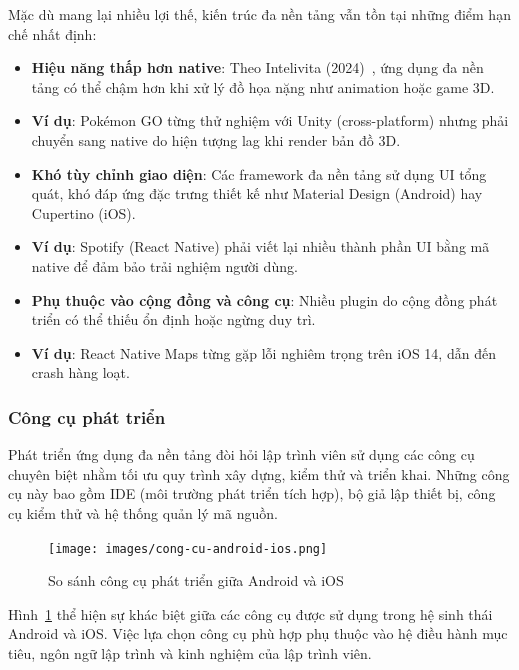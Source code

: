     Mặc dù mang lại nhiều lợi thế, kiến trúc đa nền tảng vẫn tồn tại những điểm hạn chế nhất định:
    \setlength{\leftmargini}{1.5cm}
    \begin{itemize}
        \item \textbf{Hiệu năng thấp hơn native}: Theo Intelivita (2024)~\cite{infoq2022}, ứng dụng đa nền tảng có thể chậm hơn khi xử lý đồ họa nặng như animation hoặc game 3D.
        \item \textbf{Ví dụ}: Pokémon GO từng thử nghiệm với Unity (cross-platform) nhưng phải chuyển sang native do hiện tượng lag khi render bản đồ 3D.
        \item \textbf{Khó tùy chỉnh giao diện}: Các framework đa nền tảng sử dụng UI tổng quát, khó đáp ứng đặc trưng thiết kế như Material Design (Android) hay Cupertino (iOS).
        \item \textbf{Ví dụ}: Spotify (React Native) phải viết lại nhiều thành phần UI bằng mã native để đảm bảo trải nghiệm người dùng.
        \item \textbf{Phụ thuộc vào cộng đồng và công cụ}: Nhiều plugin do cộng đồng phát triển có thể thiếu ổn định hoặc ngừng duy trì.
        \item \textbf{Ví dụ}: React Native Maps từng gặp lỗi nghiêm trọng trên iOS 14, dẫn đến crash hàng loạt.
    \end{itemize}

\subsubsection{Công cụ phát triển}

  Phát triển ứng dụng đa nền tảng đòi hỏi lập trình viên sử dụng các công cụ chuyên biệt nhằm tối ưu quy trình xây dựng, kiểm thử và triển khai. Những công cụ này bao gồm IDE (môi trường phát triển tích hợp), bộ giả lập thiết bị, công cụ kiểm thử và hệ thống quản lý mã nguồn.

  \begin{figure}[H]
    \centering
    \texttt{[image: images/cong-cu-android-ios.png]}
    \caption{So sánh công cụ phát triển giữa Android và iOS \cite{ddiandroidios}}
    \label{fig:android_ios_tools}
  \end{figure}

  Hình~\ref{fig:android_ios_tools} thể hiện sự khác biệt giữa các công cụ được sử dụng trong hệ sinh thái Android và iOS. Việc lựa chọn công cụ phù hợp phụ thuộc vào hệ điều hành mục tiêu, ngôn ngữ lập trình và kinh nghiệm của lập trình viên.


